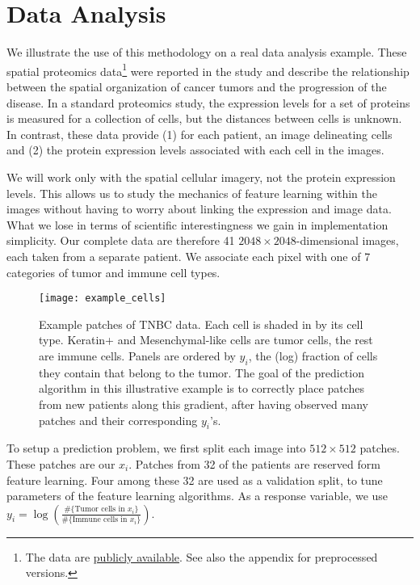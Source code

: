 
\section{Data Analysis}
\label{sec:dataset}

We illustrate the use of this methodology on a real data analysis example. These
spatial proteomics data\footnote{The data are
  \href{https://www.angelolab.com/mibi-data}{publicly available}. See also the
  appendix for preprocessed versions.} were reported in the study
\citep{keren2018structured} and describe the relationship between the spatial
organization of cancer tumors and the progression of the disease. In a standard
proteomics study, the expression levels for a set of proteins is measured for a
collection of cells, but the distances between cells is unknown. In contrast,
these data provide (1) for each patient, an image delineating cells and (2) the
protein expression levels associated with each cell in the images.

We will work only with the spatial cellular imagery, not the protein expression
levels. This allows us to study the mechanics of feature learning within the
images without having to worry about linking the expression and image data. What
we lose in terms of scientific interestingness we gain in implementation
simplicity. Our complete data are therefore 41 $2048 \times 2048$-dimensional
images, each taken from a separate patient. We associate each pixel with one of
7 categories of tumor and immune cell types.

\begin{figure}
  \centering
  \texttt{[image: example\_cells]}
  \caption{Example patches of TNBC data. Each cell is shaded in by its cell
    type. Keratin+ and Mesenchymal-like cells are tumor cells, the rest are
    immune cells. Panels are ordered by $y_i$, the (log) fraction of cells they
    contain that belong to the tumor. The goal of the prediction algorithm in
    this illustrative example is to correctly place patches from new patients
    along this gradient, after having observed many patches and their
    corresponding $y_i$'s.}
  \label{fig:example_cells}
\end{figure}


To setup a prediction problem, we first split each image into $512 \times 512$
patches. These patches are our $x_{i}$. Patches from 32 of the patients are
reserved form feature learning. Four among these 32 are used as a validation
split, to tune parameters of the feature learning algorithms. As a response
variable, we use $y_{i} = \log\left(\frac{\#\{\text{Tumor cells in
  }x_{i}\}}{\#\{\text{Immune cells in }x_i\}}\right)$.

